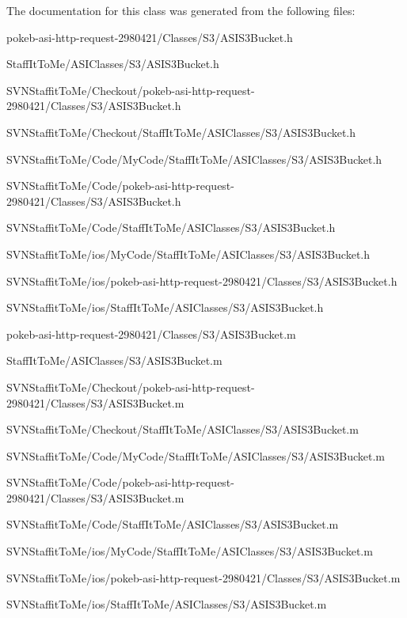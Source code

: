 \-The documentation for this class was generated from the following files\-:\begin{DoxyCompactItemize}
\item 
pokeb-\/asi-\/http-\/request-\/2980421/\-Classes/\-S3/\-A\-S\-I\-S3\-Bucket.\-h\item 
\-Staff\-It\-To\-Me/\-A\-S\-I\-Classes/\-S3/\-A\-S\-I\-S3\-Bucket.\-h\item 
\-S\-V\-N\-Staffit\-To\-Me/\-Checkout/pokeb-\/asi-\/http-\/request-\/2980421/\-Classes/\-S3/\-A\-S\-I\-S3\-Bucket.\-h\item 
\-S\-V\-N\-Staffit\-To\-Me/\-Checkout/\-Staff\-It\-To\-Me/\-A\-S\-I\-Classes/\-S3/\-A\-S\-I\-S3\-Bucket.\-h\item 
\-S\-V\-N\-Staffit\-To\-Me/\-Code/\-My\-Code/\-Staff\-It\-To\-Me/\-A\-S\-I\-Classes/\-S3/\-A\-S\-I\-S3\-Bucket.\-h\item 
\-S\-V\-N\-Staffit\-To\-Me/\-Code/pokeb-\/asi-\/http-\/request-\/2980421/\-Classes/\-S3/\-A\-S\-I\-S3\-Bucket.\-h\item 
\-S\-V\-N\-Staffit\-To\-Me/\-Code/\-Staff\-It\-To\-Me/\-A\-S\-I\-Classes/\-S3/\-A\-S\-I\-S3\-Bucket.\-h\item 
\-S\-V\-N\-Staffit\-To\-Me/ios/\-My\-Code/\-Staff\-It\-To\-Me/\-A\-S\-I\-Classes/\-S3/\-A\-S\-I\-S3\-Bucket.\-h\item 
\-S\-V\-N\-Staffit\-To\-Me/ios/pokeb-\/asi-\/http-\/request-\/2980421/\-Classes/\-S3/\-A\-S\-I\-S3\-Bucket.\-h\item 
\-S\-V\-N\-Staffit\-To\-Me/ios/\-Staff\-It\-To\-Me/\-A\-S\-I\-Classes/\-S3/\-A\-S\-I\-S3\-Bucket.\-h\item 
pokeb-\/asi-\/http-\/request-\/2980421/\-Classes/\-S3/\-A\-S\-I\-S3\-Bucket.\-m\item 
\-Staff\-It\-To\-Me/\-A\-S\-I\-Classes/\-S3/\-A\-S\-I\-S3\-Bucket.\-m\item 
\-S\-V\-N\-Staffit\-To\-Me/\-Checkout/pokeb-\/asi-\/http-\/request-\/2980421/\-Classes/\-S3/\-A\-S\-I\-S3\-Bucket.\-m\item 
\-S\-V\-N\-Staffit\-To\-Me/\-Checkout/\-Staff\-It\-To\-Me/\-A\-S\-I\-Classes/\-S3/\-A\-S\-I\-S3\-Bucket.\-m\item 
\-S\-V\-N\-Staffit\-To\-Me/\-Code/\-My\-Code/\-Staff\-It\-To\-Me/\-A\-S\-I\-Classes/\-S3/\-A\-S\-I\-S3\-Bucket.\-m\item 
\-S\-V\-N\-Staffit\-To\-Me/\-Code/pokeb-\/asi-\/http-\/request-\/2980421/\-Classes/\-S3/\-A\-S\-I\-S3\-Bucket.\-m\item 
\-S\-V\-N\-Staffit\-To\-Me/\-Code/\-Staff\-It\-To\-Me/\-A\-S\-I\-Classes/\-S3/\-A\-S\-I\-S3\-Bucket.\-m\item 
\-S\-V\-N\-Staffit\-To\-Me/ios/\-My\-Code/\-Staff\-It\-To\-Me/\-A\-S\-I\-Classes/\-S3/\-A\-S\-I\-S3\-Bucket.\-m\item 
\-S\-V\-N\-Staffit\-To\-Me/ios/pokeb-\/asi-\/http-\/request-\/2980421/\-Classes/\-S3/\-A\-S\-I\-S3\-Bucket.\-m\item 
\-S\-V\-N\-Staffit\-To\-Me/ios/\-Staff\-It\-To\-Me/\-A\-S\-I\-Classes/\-S3/\-A\-S\-I\-S3\-Bucket.\-m\end{DoxyCompactItemize}
